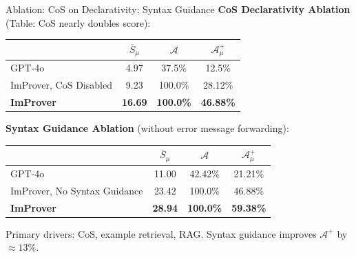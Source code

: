 \begin{frame}{Ablation: CoS on Declarativity; Syntax Guidance}
\vspace{0.3em}
\textbf{CoS Declarativity Ablation} (Table: CoS nearly doubles score):
\begin{center}
\small
\begin{tabular}{l|ccc}
\toprule
& $\overline{S}_\mu$ & $\mathcal{A}$ & $\mathcal{A}^+_\mu$\\
\midrule
GPT-4o & 4.97 & 37.5\% & 12.5\%\\
ImProver, CoS Disabled & 9.23 & 100.0\% & 28.12\%\\
\textbf{ImProver} & \textbf{16.69} & \textbf{100.0\%} & \textbf{46.88\%}\\
\bottomrule
\end{tabular}
\end{center}
\vspace{0.3em}
\textbf{Syntax Guidance Ablation} (without error message forwarding):
\begin{center}
\small
\begin{tabular}{l|ccc}
\toprule
& $\overline{S}_\mu$ & $\mathcal{A}$ & $\mathcal{A}^+_\mu$\\
\midrule
GPT-4o & 11.00 & 42.42\% & 21.21\%\\
ImProver, No Syntax Guidance & 23.42 & 100.0\% & 46.88\%\\
\textbf{ImProver} & \textbf{28.94} & \textbf{100.0\%} & \textbf{59.38\%}\\
\bottomrule
\end{tabular}
\end{center}
\small Primary drivers: CoS, example retrieval, RAG. Syntax guidance improves $\mathcal{A}^+$ by $\approx 13\%$.
\end{frame}

